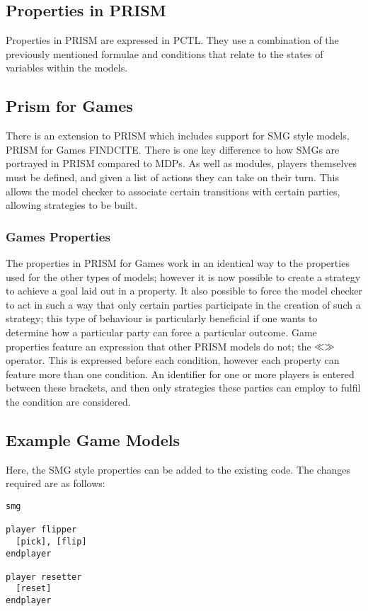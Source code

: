 \documentclass{l4proj}
\begin{document}
\subsection{Properties in PRISM}

Properties in PRISM are expressed in PCTL. They use a combination of the previously mentioned formulae and conditions that relate to the states of variables within the models.


\subsection{Prism for Games}
There is an extension to PRISM which includes support for SMG style models, PRISM for Games {FINDCITE}.
There is one key difference to how SMGs are portrayed in PRISM compared to MDPs. As well as modules, players themselves must be defined, and given a list of actions they can take on their turn. This allows the model checker to associate certain transitions with certain parties, allowing strategies to be built.
\subsubsection{Games Properties}
The properties in PRISM for Games work in an identical way to the properties used for the other types of models; however it is now possible to create a strategy to achieve a goal laid out in a property. It also possible to force the model checker to act in such a way that only certain parties participate in the creation of such a strategy; this type of behaviour is particularly beneficial if one wants to determine how a particular party can force a particular outcome. Game properties feature an expression that other PRISM models do not; the ${\tt \ll \gg}$ operator. This is expressed before each condition, however each property can feature more than one condition. An identifier for one or more players is entered between these brackets, and then only strategies these parties can employ to fulfil the condition are considered.
\subsection{Example Game Models}

Here, the SMG style properties can be added to the existing code. The changes required are as follows:

\begin{verbatim}
smg 

player flipper
  [pick], [flip]
endplayer

player resetter
  [reset]
endplayer
\end{verbatim}
\end{document}
